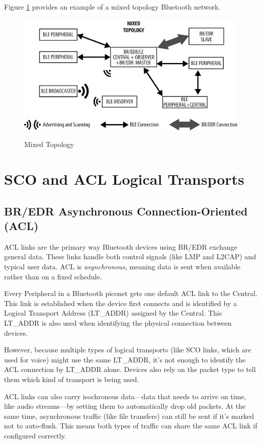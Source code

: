 Figure \ref{fig:mixedtopology} provides an example of a mixed topology Bluetooth network.

\begin{figure}[h]
    \caption{Mixed Topology}
    \includegraphics{mixedtopology.png}
    \label{fig:mixedtopology}
    \end{figure}

\section{SCO and ACL Logical Transports}

\subsection{BR/EDR Asynchronous Connection-Oriented (ACL)}

ACL links are the primary way Bluetooth devices using BR/EDR exchange general data. These links handle both control signals (like LMP and L2CAP) and typical user data. ACL is \textit{asynchronous}, meaning data is sent when available rather than on a fixed schedule.

Every Peripheral in a Bluetooth piconet gets one default ACL link to the Central. This link is established when the device first connects and is identified by a Logical Transport Address (LT\_ADDR) assigned by the Central. This LT\_ADDR is also used when identifying the physical connection between devices.

However, because multiple types of logical transports (like SCO links, which are used for voice) might use the same LT\_ADDR, it’s not enough to identify the ACL connection by LT\_ADDR alone. Devices also rely on the packet type to tell them which kind of transport is being used.

ACL links can also carry isochronous data—data that needs to arrive on time, like audio streams—by setting them to automatically drop old packets. At the same time, asynchronous traffic (like file transfers) can still be sent if it’s marked not to auto-flush. This means both types of traffic can share the same ACL link if configured correctly.


